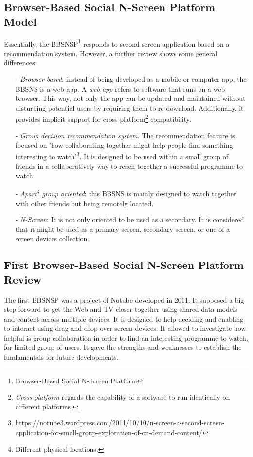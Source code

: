 \documentclass{acm_proc_article-sp}
\begin{document}
\subsection{Browser-Based Social N-Screen Platform Model}

Essentially, the BBSNSP\footnote{Browser-Based Social N-Screen Platform} responds to second screen application based on a recommendation system. However, a further review shows some general differences:

\begin{itemize}
  	\item [-]\textit{Browser-based}: instead of being developed as a mobile or computer app, the BBSNS is a web app. A \textit{web app} refers to software that runs on a web browser. This way, not only the app can be updated and maintained without disturbing potential users by requiring them to re-download. Additionally, it provides implicit support for cross-platform\footnote{\textit{Cross-platform} regards the capability of a software to run identically on different platforms.} compatibility. 
	\item [-]\textit{Group decision recommendation system}. The recommendation feature is focused on 'how collaborating together might help people find something interesting to watch'\footnote{https://notube3.wordpress.com/2011/10/10/n-screen-a-second-screen-application-for-small-group-exploration-of-on-demand-content/}. It is designed to be used within a small group of friends in a collaboratively way to reach together a successful programme to watch. 
	\item [-]\textit{Apart\footnote{Different physical locations.} group oriented}: this BBSNS is mainly designed to watch together with other friends but being remotely located. 
	\item [-]\textit{N-Screen}: It is not only oriented to be used as a secondary. It is considered that it might be used as a primary screen, secondary screen, or one of a screen devices collection. 
\end{itemize}

\subsection{First Browser-Based Social N-Screen Platform Review}

The first BBSNSP was a project of Notube developed in 2011. It supposed a big step forward to get the Web and TV closer together using shared data models and content across multiple devices\cite{schopman2010notube}. It is designed to help deciding and enabling to interact using drag and drop over screen devices. It allowed to investigate  how helpful is group collaboration in order to find an interesting programme to watch, for limited group of users. It gave the strengths and weaknesses to establish the fundamentals for future developments.
\end{document}

